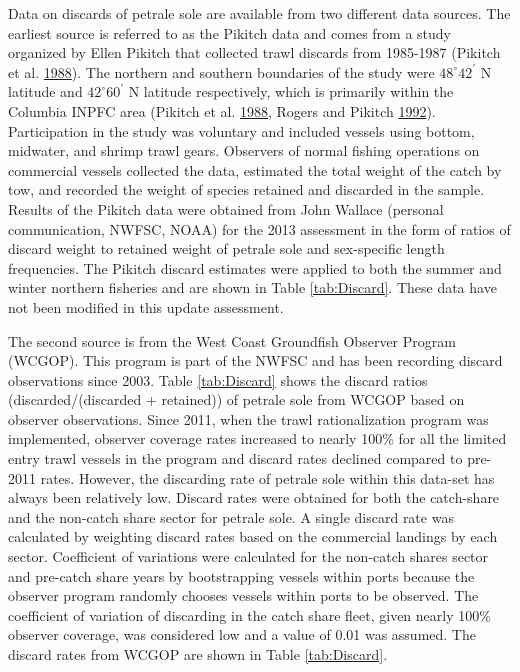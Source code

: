 \documentclass[12pt,]{article}
\begin{document}
Data on discards of petrale sole are available from two different data
sources. The earliest source is referred to as the Pikitch data and
comes from a study organized by Ellen Pikitch that collected trawl
discards from 1985-1987 (Pikitch et al.
\protect\hyperlink{ref-pikitch_evaluation_1988}{1988}). The northern and
southern boundaries of the study were \(48^\circ 42^\prime\) N latitude
and \(42^\circ 60^\prime\) N latitude respectively, which is primarily
within the Columbia INPFC area (Pikitch et al.
\protect\hyperlink{ref-pikitch_evaluation_1988}{1988}, Rogers and
Pikitch \protect\hyperlink{ref-rogers_numerical_1992}{1992}).
Participation in the study was voluntary and included vessels using
bottom, midwater, and shrimp trawl gears. Observers of normal fishing
operations on commercial vessels collected the data, estimated the total
weight of the catch by tow, and recorded the weight of species retained
and discarded in the sample. Results of the Pikitch data were obtained
from John Wallace (personal communication, NWFSC, NOAA) for the 2013
assessment in the form of ratios of discard weight to retained weight of
petrale sole and sex-specific length frequencies. The Pikitch discard
estimates were applied to both the summer and winter northern fisheries
and are shown in Table \ref{tab:Discard}. These data have not been
modified in this update assessment.

The second source is from the West Coast Groundfish Observer Program
(WCGOP). This program is part of the NWFSC and has been recording
discard observations since 2003. Table \ref{tab:Discard} shows the
discard ratios (discarded/(discarded + retained)) of petrale sole from
WCGOP based on observer observations. Since 2011, when the trawl
rationalization program was implemented, observer coverage rates
increased to nearly 100\% for all the limited entry trawl vessels in the
program and discard rates declined compared to pre-2011 rates. However,
the discarding rate of petrale sole within this data-set has always been
relatively low. Discard rates were obtained for both the catch-share and
the non-catch share sector for petrale sole. A single discard rate was
calculated by weighting discard rates based on the commercial landings
by each sector. Coefficient of variations were calculated for the
non-catch shares sector and pre-catch share years by bootstrapping
vessels within ports because the observer program randomly chooses
vessels within ports to be observed. The coefficient of variation of
discarding in the catch share fleet, given nearly 100\% observer
coverage, was considered low and a value of 0.01 was assumed. The
discard rates from WCGOP are shown in Table \ref{tab:Discard}.
\end{document}
